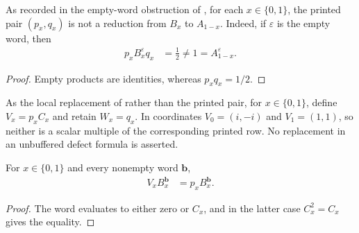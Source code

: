 \begin{lemma}
    \label{thm:mpug_czx_printed_action_empty}
    \leanok
    As recorded in the empty-word obstruction of
    \cite{gap:fbc25_czx_action_empty_word}, for each $x\in\{0,1\}$, the
    printed pair $(p_x,q_x)$ is not a reduction from $B_x$ to $A_{1-x}$.
    Indeed, if $\varepsilon$ is the empty word, then
    \begin{align}
        p_xB_x^{\varepsilon}q_x & =\tfrac12\ne1=A_{1-x}^{\varepsilon}.
        \label{eq:mpug_czx_printed_action_empty}
    \end{align}
\end{lemma}
\begin{proof}\leanok
    Empty products are identities, whereas $p_xq_x=1/2$.
\end{proof}

\begin{definition}
    \label{def:mpug_czx_dressed_action}
    \leanok
    As the local replacement of \cite{gap:fbc25_czx_action_empty_word}
    rather than the printed pair, for $x\in\{0,1\}$, define $V_x=p_xC_x$
    and retain $W_x=q_x$. In coordinates $V_0=(i,-i)$ and
    $V_1=(1,1)$, so neither is a scalar multiple of the corresponding
    printed row. No replacement in an unbuffered defect formula is asserted.
\end{definition}

\begin{lemma}
    \label{thm:mpug_czx_dressed_action_absorption}
    \leanok
    For $x\in\{0,1\}$ and every nonempty word $\mathbf b$,
    \begin{align}
        V_xB_x^{\mathbf b} & =p_xB_x^{\mathbf b}.
        \label{eq:mpug_czx_dressed_action_absorption}
    \end{align}
\end{lemma}
\begin{proof}\leanok
    The word evaluates to either zero or $C_x$, and in the latter case
    $C_x^2=C_x$ gives the equality.
\end{proof}

